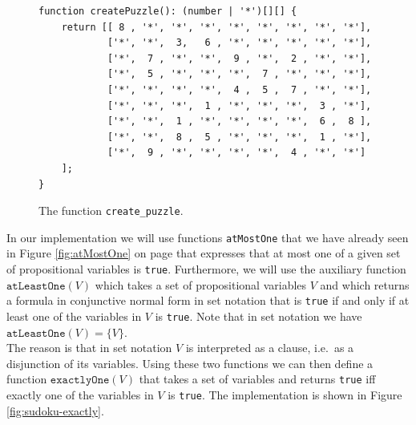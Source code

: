 \begin{figure}[!ht]
\centering
\begin{verbatim}
function createPuzzle(): (number | '*')[][] {
    return [[ 8 , '*', '*', '*', '*', '*', '*', '*', '*'],
            ['*', '*',  3,   6 , '*', '*', '*', '*', '*'],
            ['*',  7 , '*', '*',  9 , '*',  2 , '*', '*'],
            ['*',  5 , '*', '*', '*',  7 , '*', '*', '*'],
            ['*', '*', '*', '*',  4 ,  5 ,  7 , '*', '*'],
            ['*', '*', '*',  1 , '*', '*', '*',  3 , '*'],
            ['*', '*',  1 , '*', '*', '*', '*',  6 ,  8 ],
            ['*', '*',  8 ,  5 , '*', '*', '*',  1 , '*'],
            ['*',  9 , '*', '*', '*', '*',  4 , '*', '*']
    ];
}
\end{verbatim}
\vspace*{-0.3cm}
\caption{The function \texttt{create\_puzzle}.}
\label{fig:sudoku-create-puzzle}
\end{figure}

In our implementation we will use functions \texttt{atMostOne} that we have already seen in Figure
\ref{fig:atMostOne} on page \pageref{fig:atMostOne} that expresses that at most one of a given set of
propositional variables is \texttt{true}.  Furthermore, we will use the auxiliary function
$\texttt{atLeastOne}(V)$ which takes a set of propositional variables $V$ and which returns a formula in
conjunctive normal form in set notation that is \texttt{true} if and only if at least one of the variables in
$V$ is \texttt{true}.  Note that in set notation we have
\\[0.2cm]
\hspace*{1.3cm}
$\texttt{atLeastOne}(V) = \bigl\{ V \bigr\}$.
\\[0.2cm]
The reason is that in set notation  $V$ is interpreted as a clause, i.e.~as a disjunction of its variables.
Using these two functions we can then define a function $\texttt{exactlyOne}(V)$ that
takes a set of variables and returns \texttt{true} iff exactly one of the variables in $V$ is \texttt{true}.
The implementation is shown in Figure \ref{fig:sudoku-exactly}.

